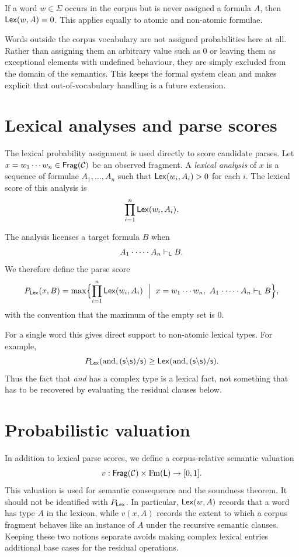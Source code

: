 \begin{remark}
If a word $w \in \Sigma$ occurs in the corpus but is never assigned a formula $A$, then
$\mathsf{Lex}(w,A)=0$. This applies equally to atomic and non-atomic formulae.
\end{remark}

\begin{remark}
Words outside the corpus vocabulary are not assigned probabilities here at all. Rather than
assigning them an arbitrary value such as $0$ or leaving them as exceptional elements with
undefined behaviour, they are simply excluded from the domain of the semantics. This keeps the
formal system clean and makes explicit that out-of-vocabulary handling is a future extension.
\end{remark}


\section{Lexical analyses and parse scores}
The lexical probability assignment is used directly to score candidate parses. Let
$x=w_1\cdots w_n \in \mathsf{Frag}(\mathcal C)$ be an observed fragment. A \emph{lexical analysis} of
$x$ is a sequence of formulae $A_1,\ldots,A_n$ such that $\mathsf{Lex}(w_i,A_i)>0$ for each $i$.
The lexical score of this analysis is
\[
\prod_{i=1}^n \mathsf{Lex}(w_i,A_i).
\]

The analysis licenses a target formula $B$ when
\[
A_1\mathbin{\cdot} \cdots \mathbin{\cdot} A_n \vdash_{\mathsf{L}} B.
\] 
We therefore define the parse score
\[
P_{\Lex}(x,B)
= \max\Bigl\{
\prod_{i=1}^n \Lex(w_i,A_i)
\ \Bigm|\
x=w_1\cdots w_n,\ 
A_1\concat\cdots\concat A_n \vdash_{\LC} B
\Bigr\},
\]
with the convention that the maximum of the empty set is $0$.

For a single word this gives direct support to non-atomic lexical types. For example,
\[
P_{\mathsf{Lex}}(\text{and},(\mathsf{s}\backslash \mathsf{s})/\mathsf{s})
\geq \mathsf{Lex}(\text{and},(\mathsf{s}\backslash \mathsf{s})/\mathsf{s}).
\]
Thus the fact that \emph{and} has a complex type is a lexical fact, not something that has to be
recovered by evaluating the residual clauses below.


\section{Probabilistic valuation}
In addition to lexical parse scores, we define a corpus-relative semantic valuation
\[
v : \mathsf{Frag}(\mathcal C) \times \mathrm{Fm}(\mathsf{L}) \to [0,1].
\]
This valuation is used for semantic consequence and the soundness theorem. It should not be
identified with $P_{\mathsf{Lex}}$. In particular, $\mathsf{Lex}(w,A)$ records that a word has type $A$ in the
lexicon, while $v(x,A)$ records the extent to which a corpus fragment behaves like an
instance of $A$ under the recursive semantic clauses. Keeping these two notions separate avoids
making complex lexical entries additional base cases for the residual operations.

